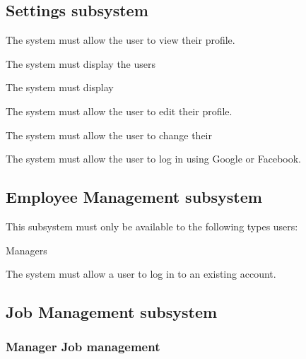 \documentclass{article}
\begin{document}
	\subsection*{Settings subsystem}	
	\begin{list}{R.}{}
	\item The system must allow the user to view their profile.
	\begin{list}{R.}{}
		\item The system must display the users
		\item The system must display 
	\end{list}
	\item The system must allow the user to edit their profile.
	\begin{list}{R.}{}
		\item The system must allow the user to change their 
		\item The system must allow the user to log in using Google or Facebook.
	\end{list}
	
	\end{list}
	
	\subsection*{Employee Management subsystem}	
	\begin{list}{R.}{}
		\item This subsystem must only be available to the following types users:
		\begin{list}{R.}{}
			\item Managers 
		\end{list}
		\item The system must allow a user to log in to an existing account.
		
	\end{list}
	\subsection*{Job Management subsystem}	

	\subsubsection*{Manager Job management}	
\end{document}
